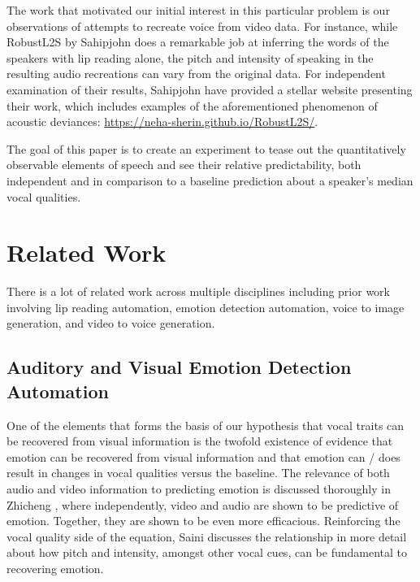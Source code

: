 \documentclass[10pt,twocolumn,letterpaper]{article}
\begin{document}
The work that motivated our initial interest in this particular problem is our observations of attempts to  recreate voice from video data. For instance, while RobustL2S by Sahipjohn  \cite{RobustL2S} does a remarkable job at inferring the words of the speakers with lip reading alone, the pitch and intensity of speaking in the resulting audio recreations can vary from the original data. For independent examination of their results, Sahipjohn  have provided a stellar website presenting their work, which includes examples of the aforementioned phenomenon of acoustic deviances: \href{https://neha-sherin.github.io/RobustL2S/}{https://neha-sherin.github.io/RobustL2S/}.

The goal of this paper is to create an experiment to tease out the quantitatively observable elements of speech and see their relative predictability, both independent and in comparison to a baseline prediction about a speaker's median vocal qualities. 

\section{Related Work}
\label{sec:related}

There is a lot of related work across multiple disciplines including prior work involving lip reading automation, emotion detection automation, voice to image generation, and video to voice generation. 


\subsection{Auditory and Visual Emotion Detection Automation}

One of the elements that forms the basis of our hypothesis that vocal traits can be recovered from visual information is the twofold existence of evidence that emotion can be recovered from visual information and that emotion can / does result in changes in vocal qualities versus the baseline. The relevance of both audio and video information to predicting emotion is discussed thoroughly in Zhicheng  \cite{EmotVid2023}, where independently, video and audio are shown to be predictive of emotion. Together, they are shown to be even more efficacious. Reinforcing the vocal quality side of the equation, Saini \cite{EmotPitch2023} discusses the relationship in more detail about how pitch and intensity, amongst other vocal cues, can be fundamental to recovering emotion.
\end{document}
